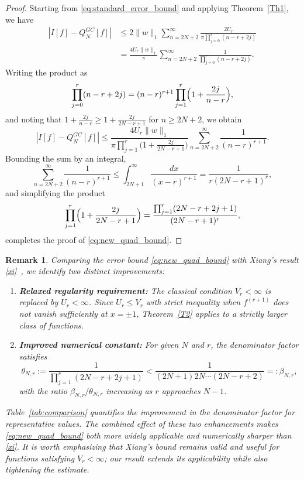 \documentclass[12pt,a4paper]{article}
\newtheorem{remark}[theorem]{Remark}
\begin{document}
\begin{proof}
    Starting from \eqref{eq:standard_error_bound} and applying Theorem~\ref{Th1}, we have
    \begin{align*}
    |I[f] - Q_N^{GC}[f]| 
    &\leq 2\|w\|_1 \sum_{n=2N+2}^{\infty} \frac{2U_r}{\pi\prod_{j=0}^{r}(n-r+2j)} \\
    &= \frac{4U_r \|w\|_1}{\pi} \sum_{n=2N+2}^{\infty} \frac{1}{\prod_{j=0}^{r}(n-r+2j)}.
    \end{align*}
    Writing the product as
    \[
    \prod_{j=0}^{r}(n-r+2j) = (n-r)^{r+1} \prod_{j=1}^{r}\Bigl(1 + \frac{2j}{n-r}\Bigr),
    \]
    and noting that $1 + \frac{2j}{n-r} \geq 1 + \frac{2j}{2N-r+1}$ for $n \geq 2N+2$, we obtain
    \[
    |I[f] - Q_N^{GC}[f]| 
    \leq \frac{4U_r \|w\|_1}{\pi \prod_{j=1}^{r}\bigl(1 + \frac{2j}{2N-r+1}\bigr)} 
    \sum_{n=2N+2}^{\infty} \frac{1}{(n-r)^{r+1}}.
    \]
    Bounding the sum by an integral,
    \[
    \sum_{n=2N+2}^{\infty} \frac{1}{(n-r)^{r+1}} 
    \leq \int_{2N+1}^{\infty} \frac{dx}{(x-r)^{r+1}} 
    = \frac{1}{r(2N-r+1)^r},
    \]
    and simplifying the product
    \[
    \prod_{j=1}^{r}\Bigl(1 + \frac{2j}{2N-r+1}\Bigr) 
    = \frac{\prod_{j=1}^{r}(2N-r+2j+1)}{(2N-r+1)^r},
    \]
    completes the proof of \eqref{eq:new_quad_bound}.
\end{proof}

\begin{remark}
    Comparing the error bound \eqref{eq:new_quad_bound} with Xiang's result \eqref{xi}~\cite{Xi}, we identify two distinct improvements:
    
    \begin{enumerate}
        \item \textbf{Relaxed regularity requirement:} The classical condition $V_r < \infty$ is replaced by $U_r < \infty$. Since $U_r \leq V_r$ with strict inequality when $f^{(r+1)}$ does not vanish sufficiently at $x = \pm 1$, Theorem~\ref{T2} applies to a strictly larger class of functions.
        
        \item \textbf{Improved numerical constant:} For given $N$ and $r$, the denominator factor satisfies
        \[
        \theta_{N,r} := \frac{1}{\prod_{j=1}^{r}(2N-r+2j+1)} 
        < \frac{1}{(2N+1)2N\cdots(2N-r+2)} =: \beta_{N,r},
        \]
        with the ratio $\beta_{N,r}/\theta_{N,r}$ increasing as $r$ approaches $N-1$.
    \end{enumerate}
    
    Table~\ref{tab:comparison} quantifies the improvement in the denominator factor for representative values. The combined effect of these two enhancements makes \eqref{eq:new_quad_bound} both more widely applicable and numerically sharper than \eqref{xi}. It is worth emphasizing that Xiang's bound remains valid and useful for functions satisfying $V_r < \infty$; our result extends its applicability while also tightening the estimate.
\end{remark}
\end{document}
